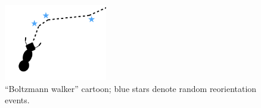 \begin{figure}[h]	\includegraphics[width=0.4\textwidth]{img/model_components_cartoons_009}
		\caption{\footnotesize{``Boltzmann walker'' cartoon; blue stars denote random reorientation events.}}
\end{figure}
